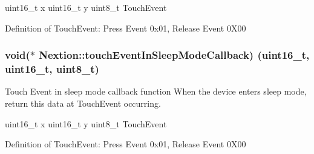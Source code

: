 uint16\+\_\+t x uint16\+\_\+t y uint8\+\_\+t Touch\+Event

Definition of Touch\+Event\+: Press Event 0x01, Release Event 0\+X00 \hypertarget{group___core_a_p_i_gaf557c4d26e864cdee80ff251a4ab7c25}{}
\subsubsection[{touch\+Event\+In\+Sleep\+Mode\+Callback}]{\setlength{\rightskip}{0pt plus 5cm}void($\ast$ Nextion\+::touch\+Event\+In\+Sleep\+Mode\+Callback) (uint16\+\_\+t, uint16\+\_\+t, uint8\+\_\+t)}\label{group___core_a_p_i_gaf557c4d26e864cdee80ff251a4ab7c25}


Touch Event in sleep mode callback function When the device enters sleep mode, return this data at Touch\+Event occurring. 

uint16\+\_\+t x uint16\+\_\+t y uint8\+\_\+t Touch\+Event

Definition of Touch\+Event\+: Press Event 0x01, Release Event 0\+X00 
